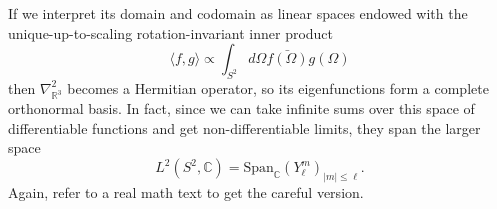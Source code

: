 \documentclass[11pt,letterpaper]{article}
\newcommand{\LP}{\left(}
\newcommand{\RP}{\right)}
\newcommand{\R}{\mathbb{R}}
\newcommand{\C}{\mathbb{C}}
\begin{document}
If we interpret its domain and codomain as linear spaces endowed with the unique-up-to-scaling rotation-invariant inner product \begin{equation}
\langle f, g \rangle \propto \int_{S^2} d \Omega \bar{f(\Omega)} g(\Omega)
\end{equation} 
then $\nabla^2_{\R^3}$ becomes a Hermitian operator, so its eigenfunctions form a complete orthonormal basis. In fact, since we can take infinite sums over this space of differentiable functions and get non-differentiable limits, they span the larger space \begin{equation}
L^2(S^2, \C) = \mbox{Span}_\C \LP Y_\ell^m \RP_{|m| \leq \ell}.
\end{equation}
Again, refer to a real math text to get the careful version.
\end{document}
